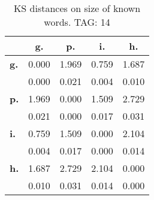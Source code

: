\begin{table}[h!]
\begin{center}
\begin{tabular}{| l || c | c | c | c |}\hline
 & {\bf g.} & {\bf p.} & {\bf i.} & {\bf h.} \\\hline\hline
{\bf g.} & 0.000 & 1.969 & 0.759 & 1.687 \\
{\bf } & 0.000 & 0.021 & 0.004 & 0.010 \\\hline
{\bf p.} & 1.969 & 0.000 & 1.509 & 2.729 \\
{\bf } & 0.021 & 0.000 & 0.017 & 0.031 \\\hline
{\bf i.} & 0.759 & 1.509 & 0.000 & 2.104 \\
{\bf } & 0.004 & 0.017 & 0.000 & 0.014 \\\hline
{\bf h.} & 1.687 & 2.729 & 2.104 & 0.000 \\
{\bf } & 0.010 & 0.031 & 0.014 & 0.000 \\\hline
\end{tabular}
\caption{KS distances on size of known words. TAG: 14}
\end{center}
\end{table}